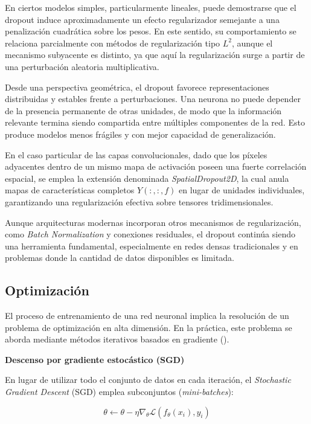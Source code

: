 \documentclass[
  spanish,
  us-letterpaper,
]{scrreprt}
\theoremstyle{definition}
\theoremstyle{remark}
\begin{document}
En ciertos modelos simples, particularmente lineales, puede demostrarse
que el dropout induce aproximadamente un efecto regularizador semejante
a una penalización cuadrática sobre los pesos. En este sentido, su
comportamiento se relaciona parcialmente con métodos de regularización
tipo \(L^2\), aunque el mecanismo subyacente es distinto, ya que aquí la
regularización surge a partir de una perturbación aleatoria
multiplicativa.

Desde una perspectiva geométrica, el dropout favorece representaciones
distribuidas y estables frente a perturbaciones. Una neurona no puede
depender de la presencia permanente de otras unidades, de modo que la
información relevante termina siendo compartida entre múltiples
componentes de la red. Esto produce modelos menos frágiles y con mejor
capacidad de generalización.

En el caso particular de las capas convolucionales, dado que los píxeles
adyacentes dentro de un mismo mapa de activación poseen una fuerte
correlación espacial, se emplea la extensión denominada
\emph{SpatialDropout2D}, la cual anula mapas de características
completos \(Y(:,:,f)\) en lugar de unidades individuales, garantizando
una regularización efectiva sobre tensores tridimensionales.

Aunque arquitecturas modernas incorporan otros mecanismos de
regularización, como \emph{Batch Normalization} y conexiones residuales,
el dropout continúa siendo una herramienta fundamental, especialmente en
redes densas tradicionales y en problemas donde la cantidad de datos
disponibles es limitada.

\subsection{Optimización}\label{optimizaciuxf3n}

El proceso de entrenamiento de una red neuronal implica la resolución de
un problema de optimización en alta dimensión. En la práctica, este
problema se aborda mediante métodos iterativos basados en gradiente
().

\textbf{Descenso por gradiente estocástico (SGD)}

En lugar de utilizar todo el conjunto de datos en cada iteración, el
\emph{Stochastic Gradient Descent} (SGD) emplea subconjuntos
(\emph{mini-batches}):

\[
\theta \leftarrow \theta - \eta \nabla_\theta \mathcal{L}(f_\theta(x_i), y_i)
\]
\end{document}
